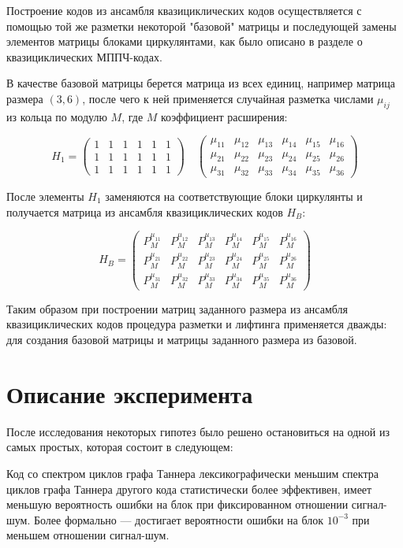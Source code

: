 Построение кодов из ансамбля квазициклических кодов осуществляется с помощью той же разметки
некоторой "базовой" матрицы и последующей замены элементов матрицы блоками циркулянтами, как было
описано в разделе о квазициклических МППЧ-кодах.

В качестве базовой матрицы берется матрица из всех единиц, например матрица размера $(3,6)$,
после чего к ней применяется случайная разметка числами $\mu_{ij}$ из кольца по модулю $M$,
 где $M$ коэффициент
расширения:

\[
	H_1 = \begin{pmatrix}
		1 & 1 & 1 & 1 & 1 & 1 \\
		1 & 1 & 1 & 1 & 1 & 1 \\
		1 & 1 & 1 & 1 & 1 & 1
	\end{pmatrix}
	\quad
	\begin{pmatrix}
		\mu_{11} & \mu_{12} & \mu_{13} & \mu_{14} & \mu_{15} & \mu_{16} \\
		\mu_{21} & \mu_{22} & \mu_{23} & \mu_{24} & \mu_{25} & \mu_{26} \\
		\mu_{31} & \mu_{32} & \mu_{33} & \mu_{34} & \mu_{35} & \mu_{36}
	\end{pmatrix}
\]

После элементы $H_1$ заменяются на соответствующие блоки циркулянты и получается матрица из ансамбля
квазициклических кодов $H_B$:

\[
H_B=\begin{pmatrix}
		P^{\mu_{11}}_M & P^{\mu_{12}}_M & P^{\mu_{13}}_M & P^{\mu_{14}}_M & P^{\mu_{15}}_M & P^{\mu_{16}}_M \\
		P^{\mu_{21}}_M & P^{\mu_{22}}_M & P^{\mu_{23}}_M & P^{\mu_{24}}_M & P^{\mu_{25}}_M & P^{\mu_{26}}_M \\
		P^{\mu_{31}}_M & P^{\mu_{32}}_M & P^{\mu_{33}}_M & P^{\mu_{34}}_M & P^{\mu_{35}}_M & P^{\mu_{36}}_M
	\end{pmatrix}
\]

Таким образом при построении матриц заданного размера из ансамбля квазициклических кодов 
процедура разметки и лифтинга
применяется дважды: для создания базовой матрицы и матрицы заданного размера из базовой.

\section{Описание эксперимента}

После исследования некоторых гипотез было решено остановиться на одной из самых простых, которая состоит в
следующем:
\begin{conjecture}
	Код со спектром циклов графа Таннера лексикографически меньшим спектра циклов графа Таннера другого
	кода статистически более эффективен, имеет меньшую вероятность ошибки на блок при фиксированном отношении
	сигнал-шум. Более формально --- достигает вероятности ошибки на блок $10^{-3}$ при меньшем отношении
	сигнал-шум.
\end{conjecture}

